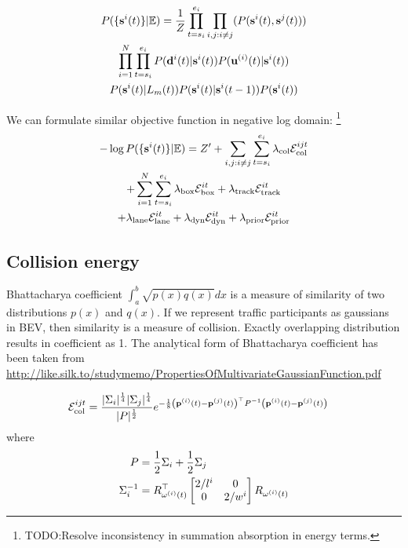 \documentclass[10pt,twocolumn,letterpaper]{article}
\begin{document}
\begin{multline}
  P(\{\state{i}{t}\} | \mathbb{E}) =
  \frac{1}{Z}
  \prod_{t=s_i}^{e_i}\prod_{i,j: i \ne j}(P(\state{i}{t}, \state{j}{t}))\\
%
  \prod_{i=1}^{N}
  \prod_{t=s_i}^{e_i}
  P(\bb{i} | \state{i}{t})
  P(\trackp{t} | \state{i}{t})\\
  P(\state{i}{t} | L_m(t))
  P(\state{i}{t} | \state{i}{t-1})
  P(\state{i}{t})
\end{multline}

We can formulate similar objective function in negative log domain:
\footnote{TODO:Resolve inconsistency in summation absorption in energy terms.}
\begin{multline}
  -\log{P(\{\mathbf{s}^{i}(t)\} | \mathbb{E})} = 
  Z' + \sum_{i,j:i\ne j} \sum_{t=s_i}^{e_i}  \lambda_{\text{col}}\mathcal{E}^{ijt}_{\text{col}} \\
  + \sum_{i=1}^N \sum_{t=s_i}^{e_i}
    \lambda_{\text{box}}\mathcal{E}^{it}_{\text{box}}
  + \lambda_{\text{track}}\mathcal{E}^{it}_{\text{track}}\\
  + \lambda_{\text{lane}}\mathcal{E}^{it}_{\text{lane}}
  + \lambda_{\text{dyn}}\mathcal{E}^{it}_{\text{dyn}}
  + \lambda_{\text{prior}}\mathcal{E}^{it}_{\text{prior}}
\end{multline}

\subsection{Collision energy}

Bhattacharya coefficient $\int_a^b\sqrt{p(x)q(x)}dx$ is a measure of similarity of two
distributions $p(x)$ and $q(x)$. If we represent traffic participants as
gaussians in BEV, then similarity is a measure of collision. Exactly
overlapping distribution results in coefficient as 1. The analytical form of
Bhattacharya coefficient has been taken from
\url{http://like.silk.to/studymemo/PropertiesOfMultivariateGaussianFunction.pdf}

\begin{align}
  \label{eq:collisionEnergyHellingerDistance}
  \mathcal{E}^{ijt}_{\text{col}} &=
  \frac{|\Sigma_i|^\frac{1}{4}|\Sigma_j|^\frac{1}{4}}
  {|P|^\frac{1}{2}}
  e^{-\frac{1}{8}
    \left(\mathbf{p}^{(i)}(t) - \mathbf{p}^{(j)}(t)\right)^\top
    P^{-1}
    \left(\mathbf{p}^{(i)}(t) - \mathbf{p}^{(j)}(t)\right)
    }
\end{align}
where 
\begin{align}
  P &= \frac{1}{2}\Sigma_i + \frac{1}{2}\Sigma_j\\
\Sigma_i^{-1} &= R^\top_{\mathbf{\omega}^{(i)}(t)} \begin{bmatrix} 2/l^i & 0 \\ 0 & 2/w^i \end{bmatrix}
R_{\mathbf{\omega}^{(i)}(t)}
\end{align}
\end{document}
